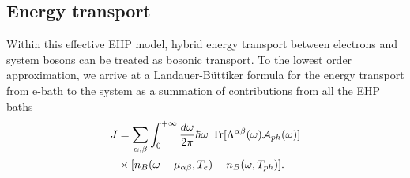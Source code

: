 \documentclass[aps,prb,
,floatfix,footinbib,shortbibliography,
preprint
]{revtex4-1}
\begin{document}



\subsection{Energy transport}
Within this effective EHP model, hybrid energy transport between  electrons and system bosons can be treated as bosonic transport.
To the lowest order approximation, we arrive at a  Landauer-B\"uttiker formula for the energy transport from e-bath to the system as a summation of contributions from all the EHP baths
\begin{align}
J &= \sum_{\alpha,\beta}\int_0^{+\infty}\frac{d\omega}{2\pi}\hbar\omega\ {\rm Tr}[\Lambda^{\alpha\beta}(\omega)\mathcal{A}_{ph}(\omega)]\nonumber\\
&\times [n_B(\omega-\mu_{\alpha\beta},{T}_{e})-n_B(\omega,T_{ph})].
\label{eq:jjtrans}
\end{align}
\end{document}
